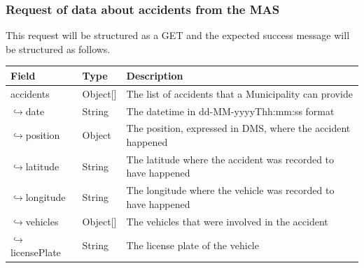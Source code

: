 				\subsubsection{Request of data about accidents from the MAS}
				This request will be structured as a GET and the expected success message will be structured as follows.
					\begin{table}[!h]
						\begin{tabular}{L{0.3\textwidth}L{0.15\textwidth}L{0.43\textwidth}}
							\toprule
							\textbf{Field} & \textbf{Type} & \textbf{Description} \\
							\midrule
									accidents & Object[] & The list of accidents that a Municipality can provide \\
									\hspace{2.5mm}$\hookrightarrow$date & String & The datetime in \newline dd-MM-yyyyThh:mm:ss format \\
									\hspace{2.5mm}$\hookrightarrow$position & Object & The position, expressed in DMS, where the accident happened \\
									\hspace{6.5mm}$\hookrightarrow$latitude & String & The latitude where the accident was recorded to have happened \\
									\hspace{6.5mm}$\hookrightarrow$longitude & String & The longitude where the vehicle was recorded to have happened \\
									\hspace{2.5mm}$\hookrightarrow$vehicles & Object[] & The vehicles that were involved in the accident \\
									\hspace{6.5mm}$\hookrightarrow$licensePlate & String & The license plate of the vehicle \\
								 	\bottomrule
								\end{tabular}
							\end{table}
